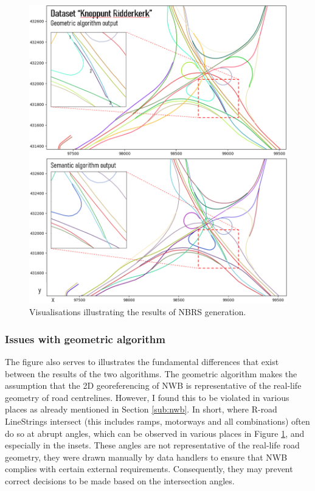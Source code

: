 \begin{figure}[]
    \centering
    \includegraphics[width=0.9\linewidth]{final_report/figs/nbrsgeneration0.png}
    \caption{Visualisations illustrating the results of NBRS generation.}
    \label{fig:nbrsgeneration0}
\end{figure}

\subsubsection{Issues with geometric algorithm}

The figure also serves to illustrates the fundamental differences that exist between the results of the two algorithms. The geometric algorithm makes the assumption that the 2D georeferencing of NWB is representative of the real-life geometry of road centrelines. However, I found this to be violated in various places as already mentioned in Section \ref{sub:nwb}. In short, where R-road LineStrings intersect (this includes ramps, motorways and all combinations) often do so at abrupt angles, which can be observed in various places in Figure \ref{fig:nbrsgeneration0}, and especially in the insets. These angles are not representative of the real-life road geometry, they were drawn manually by data handlers to ensure that NWB complies with certain external requirements. Consequently, they may prevent correct decisions to be made based on the intersection angles.

